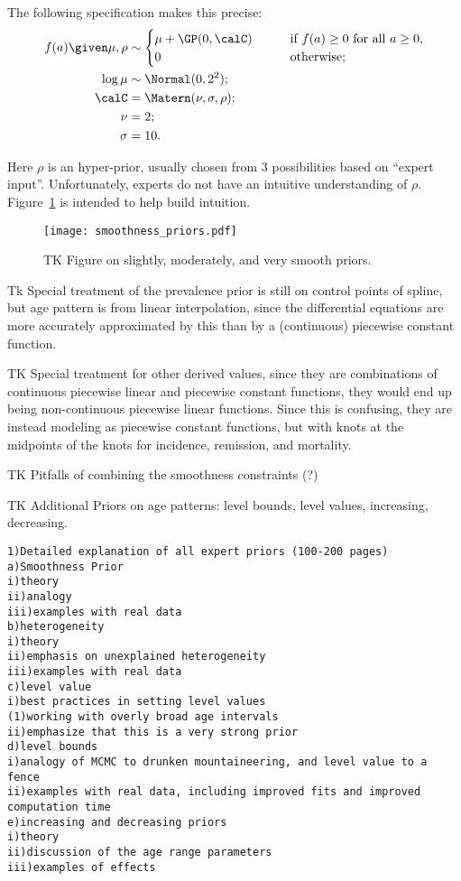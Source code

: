 The following specification makes this precise:
\begin{align*}
f(a) \given \mu,\rho &\sim
\begin{cases} \mu + \GP(0, \calC) &\qquad\text{if } f(a) \geq 0 \text{ for all } a \geq 0,\\
0 &\qquad\text{otherwise;}\\
\end{cases}\\
\log \mu &\sim \Normal(0, 2^2);\\
\calC &= \Matern(\nu, \sigma, \rho);\\
\nu &= 2;\\
\sigma &= 10.
\end{align*}

Here $\rho$ is an hyper-prior, usually chosen from $3$
possibilities based on ``expert input''.  Unfortunately, experts do
not have an intuitive understanding of $\rho$.  Figure~\ref{theory-age_pattern_model-smoothness_priors} is intended
to help build intuition.

\begin{figure}[h]
\begin{center}
\texttt{[image: smoothness\_priors.pdf]}
\end{center}
\caption{TK Figure on slightly, moderately, and very smooth priors.}
\label{theory-age_pattern_model-smoothness_priors}
\end{figure}

Tk Special treatment of the prevalence prior is still on control
points of spline, but age pattern is from linear interpolation, since
the differential equations are more accurately approximated by this
than by a (continuous) piecewise constant function.

TK Special treatment for other derived values, since they are
combinations of continuous piecewise linear and piecewise constant
functions, they would end up being non-continuous piecewise linear
functions.  Since this is confusing, they are instead modeling as
piecewise constant functions, but with knots at the midpoints of the
knots for incidence, remission, and mortality.

TK Pitfalls of combining the smoothness constraints (?)

TK Additional Priors on age patterns: level bounds, level values,
increasing, decreasing.
\begin{verbatim}
1)Detailed explanation of all expert priors (100-200 pages)
a)Smoothness Prior
i)theory
ii)analogy
iii)examples with real data
b)heterogeneity
i)theory
ii)emphasis on unexplained heterogeneity
iii)examples with real data
c)level value
i)best practices in setting level values
(1)working with overly broad age intervals
ii)emphasize that this is a very strong prior
d)level bounds
i)analogy of MCMC to drunken mountaineering, and level value to a
fence
ii)examples with real data, including improved fits and improved
computation time
e)increasing and decreasing priors
i)theory
ii)discussion of the age range parameters
iii)examples of effects
\end{verbatim}


